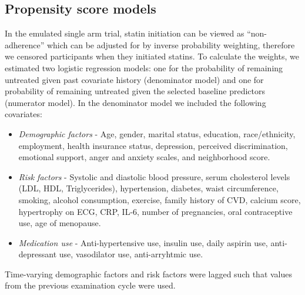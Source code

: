 \subsection{Propensity score models}\label{sec:covs}
In the emulated single arm trial, statin initiation can be viewed as ``non-adherence'' which can be adjusted for by inverse probability weighting, therefore we censored participants when they initiated statins. To calculate the weights, we estimated two logistic regression models: one for the probability of remaining untreated given past covariate history (denominator model) and one for probability of remaining untreated given the selected baseline predictors (numerator model). In the denominator model we included the following covariates:
\begin{itemize}
    \item \textit{Demographic factors} - Age, gender, marital status, education, race/ethnicity, employment, health insurance status, depression, perceived discrimination, emotional support, anger and anxiety scales, and neighborhood score.
    \item \textit{Risk factors} - Systolic and diastolic blood pressure, serum cholesterol levels (LDL, HDL, Triglycerides), hypertension, diabetes, waist circumference, smoking, alcohol consumption, exercise, family history of CVD, calcium score, hypertrophy on ECG, CRP, IL-6, number of pregnancies, oral contraceptive use, age of menopause.
    \item \textit{Medication use} - Anti-hypertensive use, insulin use, daily aspirin use, anti-depressant use, vasodilator use, anti-arryhtmic use. 
\end{itemize}
Time-varying demographic factors and risk factors were lagged such that values from the previous examination cycle were used. 

